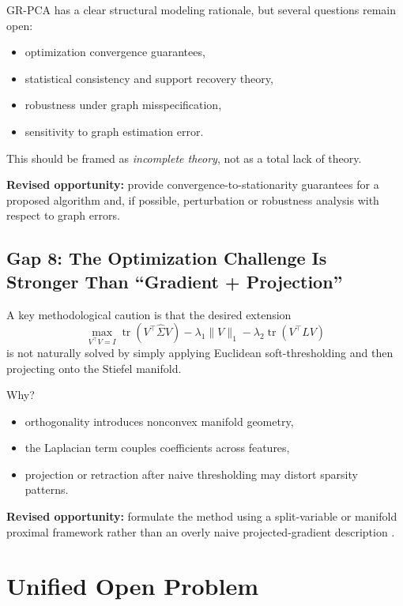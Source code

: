 \documentclass[11pt]{article}
\begin{document}
GR-PCA has a clear structural modeling rationale, but several questions remain open:
\begin{itemize}
    \item optimization convergence guarantees,
    \item statistical consistency and support recovery theory,
    \item robustness under graph misspecification,
    \item sensitivity to graph estimation error.
\end{itemize}

This should be framed as \emph{incomplete theory}, not as a total lack of theory.

\textbf{Revised opportunity:} provide convergence-to-stationarity guarantees for a proposed algorithm and, if possible, perturbation or robustness analysis with respect to graph errors.

\subsection{Gap 8: The Optimization Challenge Is Stronger Than ``Gradient + Projection''}

A key methodological caution is that the desired extension
\[
\max_{V^\top V = I}
\operatorname{tr}(V^\top \widehat{\Sigma} V)
- \lambda_1 \|V\|_1
- \lambda_2 \operatorname{tr}(V^\top L V)
\]
is not naturally solved by simply applying Euclidean soft-thresholding and then projecting onto the Stiefel manifold.

Why?
\begin{itemize}
    \item orthogonality introduces nonconvex manifold geometry,
    \item the Laplacian term couples coefficients across features,
    \item projection or retraction after naive thresholding may distort sparsity patterns.
\end{itemize}

\textbf{Revised opportunity:} formulate the method using a split-variable or manifold proximal framework rather than an overly naive projected-gradient description \cite{chen2020amanpg,chen2024nonsmoothstiefel,zhu2025stccal,li2024structurednonsmooth}.

\section{Unified Open Problem}
\end{document}
